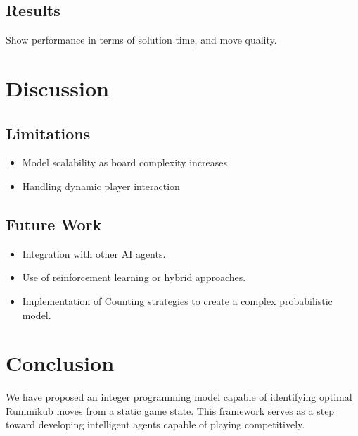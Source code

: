 \documentclass[12pt]{article}
\begin{document}
\subsection{Results}
Show performance in terms of solution time, and move quality.

\section{Discussion}
\subsection{Limitations}
\begin{itemize}
    \item Model scalability as board complexity increases
    \item Handling dynamic player interaction
\end{itemize}

\subsection{Future Work}
\begin{itemize}
    \item Integration with other AI agents.
    \item Use of reinforcement learning or hybrid approaches.
    \item Implementation of Counting strategies to create a complex probabilistic model. 
\end{itemize}

\section{Conclusion}
We have proposed an integer programming model capable of identifying optimal Rummikub moves from a static game state. This framework serves as a step toward developing intelligent agents capable of playing competitively.



\end{document}
